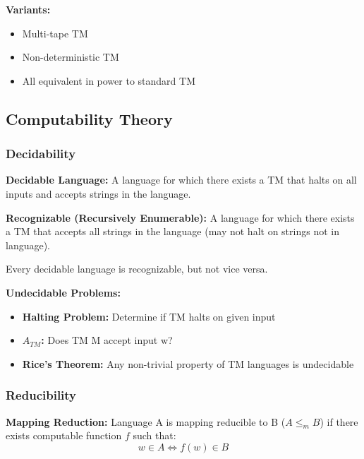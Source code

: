 \documentclass[11pt,a4paper]{article}
\begin{document}
\textbf{Variants:}
\begin{itemize}
    \item Multi-tape TM
    \item Non-deterministic TM
    \item All equivalent in power to standard TM
\end{itemize}

\subsection{Computability Theory}

\subsubsection{Decidability}

\begin{defbox}
\textbf{Decidable Language:} A language for which there exists a TM that halts on all inputs and accepts strings in the language.
\end{defbox}

\begin{defbox}
\textbf{Recognizable (Recursively Enumerable):} A language for which there exists a TM that accepts all strings in the language (may not halt on strings not in language).
\end{defbox}

\begin{thmbox}
Every decidable language is recognizable, but not vice versa.
\end{thmbox}

\textbf{Undecidable Problems:}
\begin{itemize}
    \item \textbf{Halting Problem:} Determine if TM halts on given input
    \item \textbf{$A_{TM}$:} Does TM M accept input w?
    \item \textbf{Rice's Theorem:} Any non-trivial property of TM languages is undecidable
\end{itemize}

\subsubsection{Reducibility}

\begin{defbox}
\textbf{Mapping Reduction:} Language A is mapping reducible to B ($A \leq_m B$) if there exists computable function $f$ such that:
\[
    w \in A \Leftrightarrow f(w) \in B
\]
\end{defbox}
\end{document}
